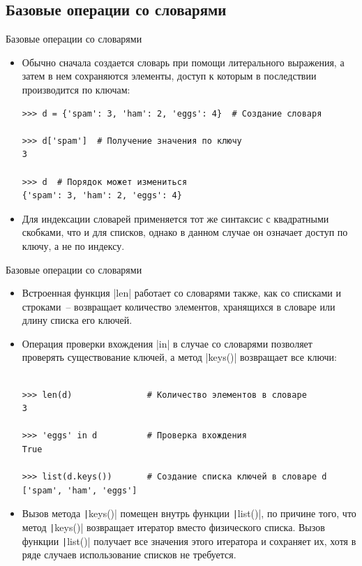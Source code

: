\documentclass[aspectratio=169, mathserif]{beamer}%
\begin{document}
\subsection{Базовые операции со словарями}

\begin{frame}[fragile]{Базовые операции со словарями}
\scriptsize
\begin{itemize}
\item Обычно сначала создается словарь при помощи литерального выражения, а затем в нем сохраняются элементы, доступ к которым в последствии производится по ключам:

\begin{verbatim}
>>> d = {'spam': 3, 'ham': 2, 'eggs': 4}  # Создание словаря

>>> d['spam']  # Получение значения по ключу
3

>>> d  # Порядок может измениться
{'spam': 3, 'ham': 2, 'eggs': 4}  
\end{verbatim}

\item Для индексации словарей применяется тот же синтаксис с квадратными скобками, что и для списков, однако в данном случае он означает доступ по ключу, а не по индексу.
\end{itemize}
\vfill
\end{frame}


\begin{frame}[fragile]{Базовые операции со словарями}
\scriptsize
\begin{itemize}
\item Встроенная функция \pythoninline|len| работает со словарями также, как со списками и строками~-- возвращает количество элементов, хранящихся в словаре или длину списка его ключей. 

\item Операция проверки вхождения \pythoninline|in| в случае со словарями позволяет проверять существование ключей, а метод \pythoninline|keys()| возвращает все ключи:

\begin{verbatim}

>>> len(d)               # Количество элементов в словаре
3

>>> 'eggs' in d          # Проверка вхождения
True

>>> list(d.keys())       # Создание списка ключей в словаре d
['spam', 'ham', 'eggs']
\end{verbatim}

\item Вызов метода \texttt|keys()| помещен внутрь функции \texttt|list()|, по причине того, что метод \texttt|keys()| возвращает итератор вместо физического списка. Вызов функции \texttt|list()| получает все значения этого итератора и сохраняет их, хотя в ряде случаев использование списков не требуется.
\end{itemize}
\vfill
\end{frame}
\end{document}
